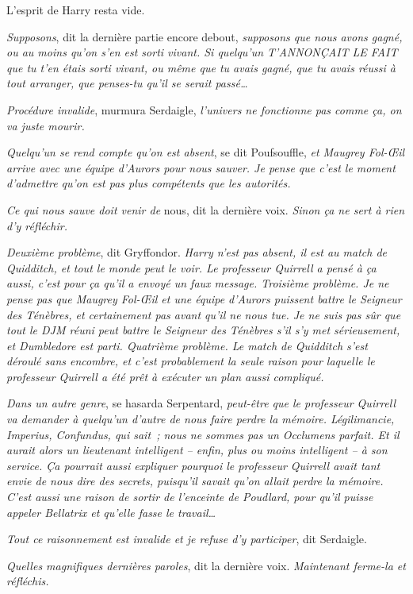L'esprit de Harry resta vide.

\emph{Supposons}, dit la dernière partie encore debout, \emph{supposons que nous avons gagné, ou au moins qu'on s'en est sorti vivant. Si quelqu'un T'ANNONÇAIT LE FAIT que tu t'en étais sorti vivant, ou même que tu avais gagné, que tu avais réussi à tout arranger, que penses-tu qu'il se serait passé…}

\emph{Procédure invalide}, murmura Serdaigle, \emph{l'univers ne fonctionne pas comme ça, on va juste mourir.}

\emph{Quelqu'un se rend compte qu'on est absent}, se dit Poufsouffle, \emph{et Maugrey Fol-Œil arrive avec une équipe d'Aurors pour nous sauver. Je pense que c'est le moment d'admettre qu'on est pas plus compétents que les autorités.}

\emph{Ce qui nous sauve doit venir de} nous, dit la dernière voix. \emph{Sinon ça ne sert à rien d'y réfléchir.}

\emph{Deuxième problème}, dit Gryffondor. \emph{Harry n'est pas absent, il est au match de Quidditch, et tout le monde peut le voir. Le professeur Quirrell a pensé à ça aussi, c'est pour ça qu'il a envoyé un faux message. Troisième problème. Je ne pense pas que Maugrey Fol-Œil et une équipe d'Aurors puissent battre le Seigneur des Ténèbres, et certainement pas avant qu'il ne nous tue. Je ne suis pas sûr que tout le DJM réuni peut battre le Seigneur des Ténèbres s'il s'y met sérieusement, et Dumbledore est parti. Quatrième problème. Le match de Quidditch s'est déroulé sans encombre, et c'est probablement la seule raison pour laquelle le professeur Quirrell a été prêt à exécuter un plan aussi compliqué.}

\emph{Dans un autre genre}, se hasarda Serpentard, \emph{peut-être que le professeur Quirrell va demander à quelqu'un d'autre de nous faire perdre la mémoire. Légilimancie, Imperius, Confundus, qui sait~; nous ne sommes pas un Occlumens parfait. Et il aurait alors un lieutenant intelligent -- enfin, plus ou moins intelligent -- à son service. Ça pourrait aussi expliquer pourquoi le professeur Quirrell avait tant envie de nous dire des secrets, puisqu'il savait qu'on allait perdre la mémoire. C'est aussi une raison de sortir de l'enceinte de Poudlard, pour qu'il puisse appeler Bellatrix et qu'elle fasse le travail…}

\emph{Tout ce raisonnement est invalide et je refuse d'y participer}, dit Serdaigle.

\emph{Quelles magnifiques dernières paroles}, dit la dernière voix. \emph{Maintenant ferme-la et réfléchis.}

